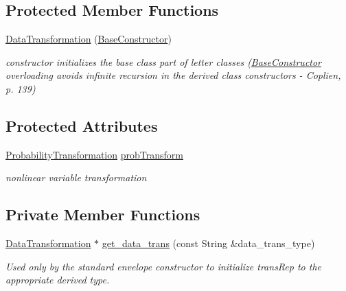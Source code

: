 \subsection*{Protected Member Functions}
\begin{DoxyCompactItemize}
\item 
\hyperlink{classPecos_1_1DataTransformation_a1ddd1ccaa2f96ba01a8fdc35829debdf}{Data\+Transformation} (\hyperlink{structPecos_1_1BaseConstructor}{Base\+Constructor})
\begin{DoxyCompactList}\small\item\em constructor initializes the base class part of letter classes (\hyperlink{structPecos_1_1BaseConstructor}{Base\+Constructor} overloading avoids infinite recursion in the derived class constructors -\/ Coplien, p. 139) \end{DoxyCompactList}\end{DoxyCompactItemize}
\subsection*{Protected Attributes}
\begin{DoxyCompactItemize}
\item 
\hyperlink{classPecos_1_1ProbabilityTransformation}{Probability\+Transformation} \hyperlink{classPecos_1_1DataTransformation_a27ea3538189216bba606225bcf878c0e}{prob\+Transform}\label{classPecos_1_1DataTransformation_a27ea3538189216bba606225bcf878c0e}

\begin{DoxyCompactList}\small\item\em nonlinear variable transformation \end{DoxyCompactList}\end{DoxyCompactItemize}
\subsection*{Private Member Functions}
\begin{DoxyCompactItemize}
\item 
\hyperlink{classPecos_1_1DataTransformation}{Data\+Transformation} $\ast$ \hyperlink{classPecos_1_1DataTransformation_aa27a9de86c24611e4e778ec5f08ee28c}{get\+\_\+data\+\_\+trans} (const String \&data\+\_\+trans\+\_\+type)
\begin{DoxyCompactList}\small\item\em Used only by the standard envelope constructor to initialize trans\+Rep to the appropriate derived type. \end{DoxyCompactList}\end{DoxyCompactItemize}
